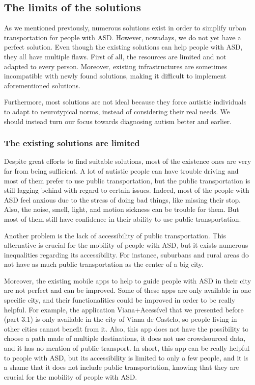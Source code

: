 \subsection{The limits of the solutions}

As we mentioned previously, numerous solutions exist in order to simplify urban transportation for people with ASD. However, nowadays, we do not yet have a perfect solution. Even though the existing solutions can help people with ASD, they all have multiple flaws. First of all, the resources are limited and not adapted to every person. Moreover, existing infrastructures are sometimes incompatible with newly found solutions, making it difficult to implement aforementioned solutions.

Furthermore, most solutions are not ideal because they force autistic individuals to adapt to neurotypical norms, instead of considering their real needs. We should instead turn our focus towards diagnosing autism better and earlier.

\subsubsection{The existing solutions are limited}

Despite great efforts to find suitable solutions, most of the existence ones are very far from being sufficient. A lot of autistic people can have trouble driving and most of them prefer to use public transportation\cite{2015ViewpointsAdultsAutism}\cite{2020DevelopingCommunityMobility}, but the public transportation is still lagging behind with regard to certain issues. Indeed, most of the people with ASD feel anxious due to the stress of doing bad things, like missing their stop. Also, the noise, smell, light, and motion sickness can be trouble for them. But most of them still have confidence in their ability to use public transportation\cite{2020ExperiencesYoungAutistic}.

Another problem  is the lack of accessibility of public transportation. This alternative is crucial for the mobility of people with ASD, but it exists numerous inequalities regarding its accessibility. For instance, suburbans and rural areas do not have as much public transportation as the center of a big city\cite{2015DetourRightPlace}.

Moreover, the existing mobile apps to help to guide people with ASD in their city are not perfect and can be improved. Some of these apps are only available in one specific city, and their functionalities could be improved in order to be really helpful. For example, the application Viana+Acessível that we presented before (part 3.1) is only available in the city of Viana de Castelo, so people living in other cities cannot benefit from it. Also, this app does not have the possibility to choose a path made of multiple destinations, it does not use crowdsourced data, and it has no mention of public transport. In short, this app can be really helpful to people with ASD, but its accessibility is limited to only a few people, and it is a shame that it does not include public transportation, knowing that they are crucial for the mobility of people with ASD\cite{2023AccessibilityStrategiesPromote}.


